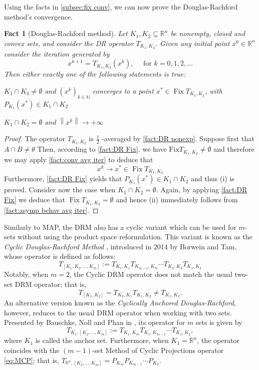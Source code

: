 \documentclass[smallextended,numbook,nospthms]{svjour3}
\theoremstyle{plain}
\newtheorem{fact}[theorem]{Fact}
\theoremstyle{definition}
\def\RR{\mathds R}
\def\NN{\mathds N}
\DeclareMathOperator{\Fix}{Fix}
\begin{document}
Using the facts in \cref{subsec:fix conv}, we can now prove the Douglas-Rachford method's convergence.
\begin{fact}[Douglas-Rachford method]\label{fact:DR conv}
Let $K_1, K_2 \subseteq \RR^n$ be nonempty, closed and convex sets, and consider the DR operator $T_{K_1, K_2}$. Given any initial point $x^{0} \in \RR^n$
consider the iteration generated by
\[
x^{k+1}=T_{K_1, K_2}\left(x^{k}\right), \quad \text { for } k=0,1,2, \dots
\]
Then either exactly one of the following statements is true:
\begin{listi}
\item $K_1 \cap K_2 \neq \emptyset$ and $\left(x^{k}\right)_{k \in \NN}$ converges to a point $x^{*} \in \Fix T_{K_1, K_2}$, with $P_{K_1}\left(x^{*}\right) \in K_1 \cap K_2$
\item $K_1 \cap K_2=\emptyset$ and $\left\|x^{k}\right\| \rightarrow+\infty$
\end{listi}
\end{fact}
\begin{proof}
The operator $T_{K_1, K_2}$ is $\frac{1}{2}$ -averaged by \cref{fact:DR nonexp}. Suppose first that $A \cap B \neq \theta$ Then, according to \cref{fact:DR Fix}. we have $\mathrm{Fix} T_{K_1, K_2} \neq \emptyset$ and therefore we may apply \cref{fact:conv avg iter} to deduce that
\[
x^{k} \rightarrow x^{*} \in \operatorname{Fix} T_{K_1, K_2}
\]
Furthermore, \cref{fact:DR Fix} yields that $P_{K_1}\left(x^{*}\right) \in K_1 \cap K_2$ and thus
(i) is proved. Consider now the case when $K_1 \cap K_2=\emptyset$. Again, by applying \cref{fact:DR Fix} we deduce that $\Fix T_{K_1, K_2}=\emptyset$ and hence
(ii) immediately follows from \cref{fact:asymp behav avg iter}.
\end{proof}

Similarly to MAP, the DRM also has a cyclic variant which can be used for $m$-sets without using the product space reformulation. This variant is known as the \emph{Cyclic Douglas-Rachford Method} \cite{Borwein:2014}, introduced in 2014 by Borwein and Tam, whose operator is defined as follows:
\[
T_{\left[K_{1}, K_{2}, \ldots, K_{m}\right]}:=T_{K_{r}, K_{1}} T_{K_{m-1}, K_{m}} \cdots T_{K_{2}, K_{3}} T_{K_{1}, K_{2}}
\]
Notably, when $m=2$, the Cyclic DRM operator does not match the usual two-set DRM operator; that is,
\[
T_{[K_1, K_2]}=T_{K_2, K_1} T_{K_1, K_2} \neq T_{K_1, K_2}.
\]
An alternative version known as the \emph{Cyclically Anchored Douglas-Rachford}, however, reduces to the usual DRM operator when working with two sets. Presented by Bauschke, Noll and Phan in \cite{Bauschke:2015df}, its operator for $m$ sets is given by
\[
T_{K_{1},\left[K_{2}, \ldots, K_{m}\right]}:=T_{K_{1}, K_{m}} T_{K_{1}, K_{m-1}} \cdots T_{K_{1}, K_{2}},
\]
where $K_{1}$ is called the anchor set. Furthermore, when $K_1=\RR^n$, the operator coincides with the $(m-1)$-set Method of Cyclic Projections operator \cref{eq:MCP}; that is, $T_{\RR^n,\left[K_{2}, \ldots, K_{m}\right]}=P_{K_{m}} P_{K_{m-1}} \cdots P_{K_{2}}$.
\end{document}
